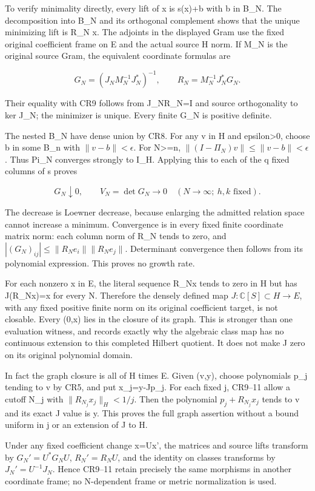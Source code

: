 To verify minimality directly, every lift of x is s(x)+b with b in B\_N. The decomposition into B\_N and its orthogonal complement shows that the unique minimizing lift is R\_N x. The adjoints in the displayed Gram use the fixed original coefficient frame on E and the actual source H norm. If M\_N is the original source Gram, the equivalent coordinate formulas are

\[
G_N=(J_NM_N^{-1}J_N^*)^{-1},\qquad
R_N=M_N^{-1}J_N^*G_N.
\tag{CR10}
\]

Their equality with CR9 follows from J\_NR\_N=I and source orthogonality to ker J\_N; the minimizer is unique. Every finite G\_N is positive definite.

The nested B\_N have dense union by CR8. For any v in H and epsilon\textgreater0, choose b in some B\_n with \(\|v-b\|<\epsilon\). For N\textgreater=n, \(\|(I-\Pi_N)v\|\le\|v-b\|<\epsilon\). Thus Pi\_N converges strongly to I\_H. Applying this to each of the q fixed columns of s proves

\[
\boxed{G_N\downarrow0,\qquad V_N=\det G_N\longrightarrow0
\quad(N\longrightarrow\infty;\ h,k\text{ fixed}).}
\tag{CR11}
\]

The decrease is Loewner decrease, because enlarging the admitted relation space cannot increase a minimum. Convergence is in every fixed finite coordinate matrix norm: each column norm of R\_N tends to zero, and \(|(G_N)_{ij}|\le\|R_Ne_i\|\|R_Ne_j\|\). Determinant convergence then follows from its polynomial expression. This proves no growth rate.

For each nonzero x in E, the literal sequence R\_Nx tends to zero in H but has J(R\_Nx)=x for every N. Therefore the densely defined map \(J:\mathbb C[S]\subset H\to E\), with any fixed positive finite norm on its original coefficient target, is not closable. Every (0,x) lies in the closure of its graph. This is stronger than one evaluation witness, and records exactly why the algebraic class map has no continuous extension to this completed Hilbert quotient. It does not make J zero on its original polynomial domain.

In fact the graph closure is all of H times E. Given (v,y), choose polynomials p\_j tending to v by CR5, and put x\_j=y-Jp\_j. For each fixed j, CR9--11 allow a cutoff N\_j with \(\|R_{N_j}x_j\|_H<1/j\). Then the polynomial \(p_j+R_{N_j}x_j\) tends to v and its exact J value is y. This proves the full graph assertion without a bound uniform in j or an extension of J to H.

Under any fixed coefficient change x=Ux', the matrices and source lifts transform by \(G_N'=U^*G_NU\), \(R_N'=R_NU\), and the identity on classes transforms by \(J_N'=U^{-1}J_N\). Hence CR9--11 retain precisely the same morphisms in another coordinate frame; no N-dependent frame or metric normalization is used.

